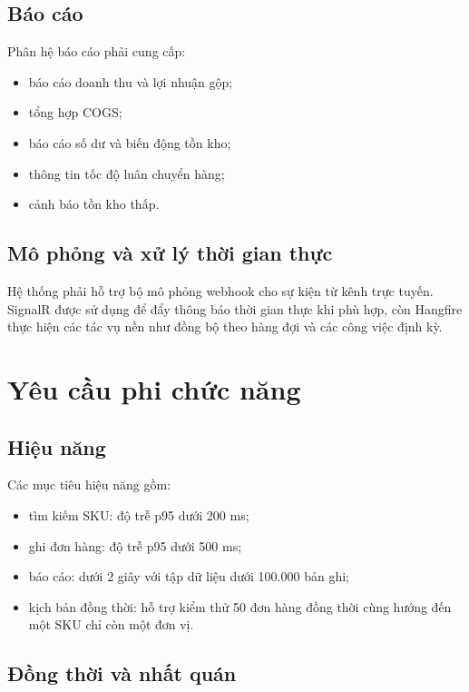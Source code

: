 \subsection{Báo cáo}

Phân hệ báo cáo phải cung cấp:

\begin{itemize}
    \item báo cáo doanh thu và lợi nhuận gộp;
    \item tổng hợp COGS;
    \item báo cáo số dư và biến động tồn kho;
    \item thông tin tốc độ luân chuyển hàng;
    \item cảnh báo tồn kho thấp.
\end{itemize}

\subsection{Mô phỏng và xử lý thời gian thực}

Hệ thống phải hỗ trợ bộ mô phỏng webhook cho sự kiện từ kênh trực tuyến. SignalR được sử dụng
để đẩy thông báo thời gian thực khi phù hợp, còn Hangfire thực hiện các tác vụ nền như đồng bộ
theo hàng đợi và các công việc định kỳ.

\section{Yêu cầu phi chức năng}

\subsection{Hiệu năng}

Các mục tiêu hiệu năng gồm:

\begin{itemize}
    \item tìm kiếm SKU: độ trễ p95 dưới 200 ms;
    \item ghi đơn hàng: độ trễ p95 dưới 500 ms;
    \item báo cáo: dưới 2 giây với tập dữ liệu dưới 100.000 bản ghi;
    \item kịch bản đồng thời: hỗ trợ kiểm thử 50 đơn hàng đồng thời cùng hướng đến một SKU chỉ còn một đơn vị.
\end{itemize}

\subsection{Đồng thời và nhất quán}


